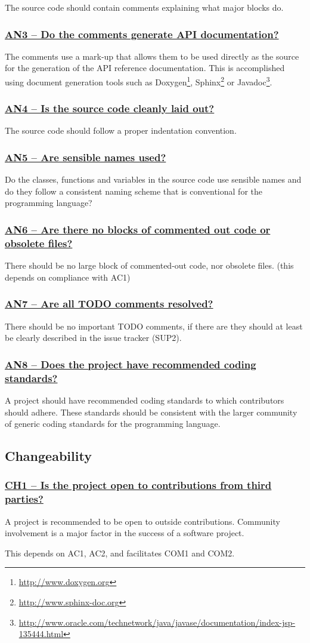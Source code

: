 \documentclass[a4paper,11pt]{article}
\newcommand{\criterion}[1]{\subsubsection*{\underline{#1}}}
\begin{document}
The source code should contain comments explaining what major blocks do.

\criterion{AN3 -- Do the comments generate API documentation?}

The comments use a mark-up that allows them to be used directly as the
source for the generation of the API reference documentation. This is
accomplished using document generation tools such as Doxygen\footnote{\url{http://www.doxygen.org}}, Sphinx\footnote{\url{http://www.sphinx-doc.org}} or
Javadoc\footnote{\url{http://www.oracle.com/technetwork/java/javase/documentation/index-jsp-135444.html}}.

\criterion{AN4 -- Is the source code cleanly laid out?}

The source code should follow a proper indentation convention. 

\criterion{AN5 -- Are sensible names used?}

Do the classes, functions and variables in the source code use sensible names
and do they follow a consistent naming scheme that is conventional for the
programming language?

\criterion{AN6 -- Are there no blocks of commented out code or obsolete files?}

There should be no large block of commented-out code, nor obsolete files.
(this depends on compliance with AC1)

\criterion{AN7 -- Are all TODO comments resolved?}

There should be no important TODO comments, if there are they should at least be
clearly described in the issue tracker (SUP2).

\criterion{AN8 -- Does the project have recommended coding standards?}

A project should have recommended coding standards to which contributors
should adhere. These standards should be consistent with the larger community
of generic coding standards for the programming language.

\subsection{Changeability}

\criterion{CH1 -- Is the project open to contributions from third parties?}

A project is recommended to be open to outside contributions. Community
involvement is a major factor in the success of a software project. 

This depends on AC1, AC2, and facilitates COM1 and COM2. 
\end{document}
